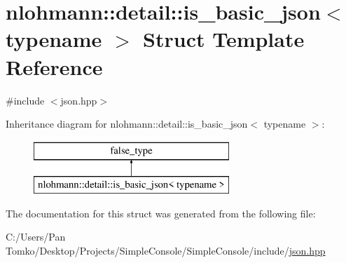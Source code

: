 \hypertarget{structnlohmann_1_1detail_1_1is__basic__json}{}\section{nlohmann\+::detail\+::is\+\_\+basic\+\_\+json$<$ typename $>$ Struct Template Reference}
\label{structnlohmann_1_1detail_1_1is__basic__json}


{\ttfamily \#include $<$json.\+hpp$>$}

Inheritance diagram for nlohmann\+::detail\+::is\+\_\+basic\+\_\+json$<$ typename $>$\+:\begin{figure}[H]
\begin{center}
\leavevmode
\includegraphics[height=2.000000cm]{d4/df6/structnlohmann_1_1detail_1_1is__basic__json}
\end{center}
\end{figure}


The documentation for this struct was generated from the following file\+:\begin{DoxyCompactItemize}
\item 
C\+:/\+Users/\+Pan Tomko/\+Desktop/\+Projects/\+Simple\+Console/\+Simple\+Console/include/\mbox{\hyperlink{json_8hpp}{json.\+hpp}}\end{DoxyCompactItemize}
